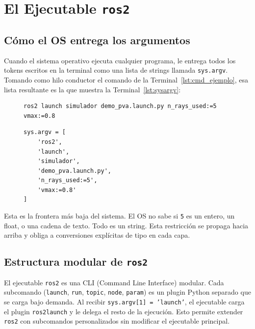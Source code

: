 \section{El Ejecutable \texttt{ros2}}

\subsection{Cómo el OS entrega los argumentos}

Cuando el sistema operativo ejecuta cualquier programa, le entrega todos los tokens escritos en la terminal como una lista de strings llamada \texttt{sys.argv}. Tomando como hilo conductor el comando de la Terminal~\ref{lst:cmd_ejemplo}, esa lista resultante es la que muestra la Terminal~\ref{lst:sysargv}:

\begin{figure}[H]
\centering
\begin{lstlisting}[style=bash, caption={Comando de ejemplo usado como hilo conductor.}, label={lst:cmd_ejemplo}]
ros2 launch simulador demo_pva.launch.py n_rays_used:=5 vmax:=0.8
\end{lstlisting}
\end{figure}

\begin{figure}[H]
\centering
\begin{lstlisting}[style=python, caption={\texttt{sys.argv} recibido por el ejecutable \texttt{ros2}.}, label={lst:sysargv}]
sys.argv = [
    'ros2',
    'launch',
    'simulador',
    'demo_pva.launch.py',
    'n_rays_used:=5',
    'vmax:=0.8'
]
\end{lstlisting}
\end{figure}

Esta es la frontera más baja del sistema. El OS no sabe si \texttt{5} es un entero, un float, o una cadena de texto. Todo es un string. Esta restricción se propaga hacia arriba y obliga a conversiones explícitas de tipo en cada capa.

\subsection{Estructura modular de \texttt{ros2}}

El ejecutable \texttt{ros2} es una CLI (Command Line Interface) modular. Cada subcomando (\texttt{launch}, \texttt{run}, \texttt{topic}, \texttt{node}, \texttt{param}) es un plugin Python separado que se carga bajo demanda. Al recibir \texttt{sys.argv[1] = 'launch'}, el ejecutable carga el plugin \texttt{ros2launch} y le delega el resto de la ejecución. Esto permite extender \texttt{ros2} con subcomandos personalizados sin modificar el ejecutable principal.

